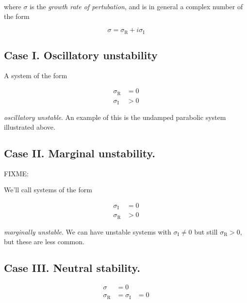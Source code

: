 where $\sigma$ is the \textit{growth rate of pertubation}, and is in general a complex number of the form

\begin{equation}\label{eqn:continuumL21:30}
\sigma = \sigma_\text{R} + i \sigma_\text{I}
\end{equation}

\subsection{Case I.  Oscillatory unstability}

A system of the form

\begin{align*}
\sigma_{\text{R}} &= 0 \\
\sigma_{\text{I}} &> 0
\end{align*}

\textit{oscillatory unstable}.  An example of this is the undamped parabolic system illustrated above.

\subsection{Case II.  Marginal unstability.}

FIXME:

We'll call systems of the form

\begin{align*}
\sigma_{\text{I}} &= 0 \\
\sigma_{\text{R}} &> 0
\end{align*}

\textit{marginally unstable}.  We can have unstable systems with $\sigma_{\text{I}} \ne 0$ but still $\sigma_{\text{R}} > 0$, but these are less common.

\subsection{Case III.  Neutral stability.}

\begin{align*}
\sigma &= 0 \\
\sigma_{\text{R}} &= \sigma_{\text{I}} &= 0
\end{align*}

